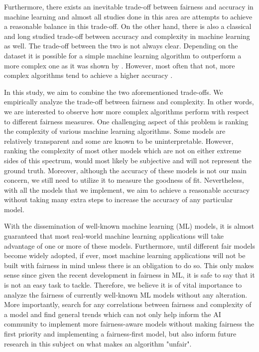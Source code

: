 Furthermore, there exists an inevitable trade-off between fairness and accuracy in machine learning and almost all studies done in this area are attempts to achieve a reasonable balance in this trade-off. On the other hand, there is also a classical and long studied trade-off between accuracy and complexity in machine learning as well. The trade-off between the two is not always clear. Depending on the dataset it is possible for a simple machine learning algorithm to outperform a more complex one as it was shown by \citet{holte1993very}. However, most often that not, more complex algorithms tend to achieve a higher accuracy \cite{zemel2013learning}.

In this study, we aim to combine the two aforementioned trade-offs. We empirically analyze the trade-off between fairness and complexity. In other words, we are interested to observe how more complex algorithms perform with respect to different fairness measures. One challenging aspect of this problem is ranking the complexity of various machine learning algorithms. Some models are relatively transparent and some are known to be uninterpretable. However, ranking the complexity of most other models which are not on either extreme sides of this spectrum, would most likely be subjective and will not represent the ground truth. Moreover, although the accuracy of these models is not our main concern, we still need to utilize it to measure the goodness of fit. Nevertheless, with all the models that we implement, we aim to achieve a reasonable accuracy without taking many extra steps to increase the accuracy of any particular model.

With the dissemination of well-known machine learning (ML) models, it is almost guaranteed that most real-world machine learning applications will take advantage of one or more of these models. Furthermore, until different fair models become widely adopted, if ever, most machine learning applications will not be built with fairness in mind unless there is an obligation to do so. This only makes sense since given the recent development in fairness in ML, it is safe to say that it is not an easy task to tackle. Therefore, we believe it is of vital importance to analyze the fairness of currently well-known ML models without any alteration. More importantly, search for any correlations between fairness and complexity of a model and find general trends which can not only help inform the AI community to implement more fairness-aware models without making fairness the first priority and implementing a fairness-first model, but also inform future research in this subject on what makes an algorithm "unfair".